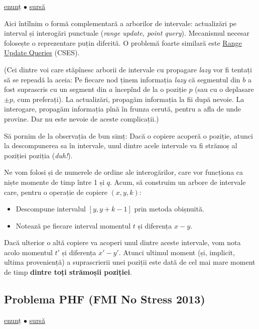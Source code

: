 \href{https://codeforces.com/contest/292/problem/E}{enunț}
$\bullet$
\hyperref[code:copying-data]{sursă}

Aici întîlnim o formă complementară a arborilor de intervale: actualizări pe interval și interogări punctuale (\textit{range update, point query}). Mecanismul necesar folosește o reprezentare puțin diferită. O problemă foarte similară este \href{https://cses.fi/problemset/task/1651}{Range Update Queries} (CSES).

(Cei dintre voi care stăpînesc arborii de intervale cu propagare \textit{lazy} vor fi tentați să se repeadă la aceia: Pe fiecare nod ținem informația \textit{lazy} că segmentul din $b$ a fost suprascris cu un segment din $a$ începînd de la o poziție $p$ (sau cu o deplasare $\pm p$, cum preferați). La actualizări, propagăm informația la fii după nevoie. La interogare, propagăm informația pînă în frunza cerută, pentru a afla de unde provine. Dar nu este nevoie de aceste complicații.)

Să pornim de la observația de bun simț: Dacă o copiere acoperă o poziție, atunci la descompunerea sa în intervale, unul dintre acele intervale va fi strămoș al poziției poziția (\textit{duh!}).

Ne vom folosi și de numerele de ordine ale interogărilor, care vor funcționa ca niște momente de timp între 1 și $q$. Acum, să construim un arbore de intervale care, pentru o operație de copiere $(x, y, k)$:

\begin{itemize}
  \item Descompune intervalul $[y, y + k - 1]$ prin metoda obișnuită.
  \item Notează pe fiecare interval momentul $t$ și diferența $x-y$.
\end{itemize}

Dacă ulterior o altă copiere va acoperi unul dintre aceste intervale, vom nota acolo momentul $t'$ și diferența $x'-y'$. Atunci ultimul moment (și, implicit, ultima proveniență) a suprascrierii unei poziții este dată de cel mai mare moment de timp \textbf{dintre toți strămoșii poziției}.

\subsection{Problema PHF (FMI No Stress 2013)}
\label{problem:phf}

\href{https://kilonova.ro/problems/3234}{enunț}
$\bullet$
\hyperref[code:phf]{sursă}

